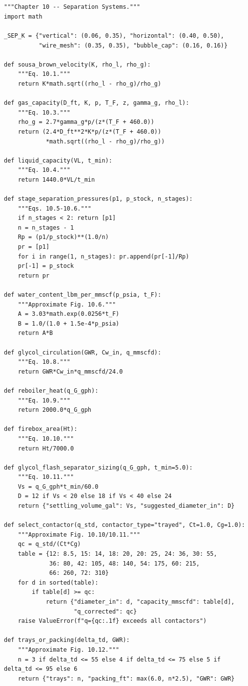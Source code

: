 \documentclass[10pt,a4paper,openany]{book}
\begin{document}
\chapter{}
\begin{lstlisting}
"""Chapter 10 -- Separation Systems."""
import math

_SEP_K = {"vertical": (0.06, 0.35), "horizontal": (0.40, 0.50),
          "wire_mesh": (0.35, 0.35), "bubble_cap": (0.16, 0.16)}

def sousa_brown_velocity(K, rho_l, rho_g):
    """Eq. 10.1."""
    return K*math.sqrt((rho_l - rho_g)/rho_g)

def gas_capacity(D_ft, K, p, T_F, z, gamma_g, rho_l):
    """Eq. 10.3."""
    rho_g = 2.7*gamma_g*p/(z*(T_F + 460.0))
    return (2.4*D_ft**2*K*p/(z*(T_F + 460.0))
            *math.sqrt((rho_l - rho_g)/rho_g))

def liquid_capacity(VL, t_min):
    """Eq. 10.4."""
    return 1440.0*VL/t_min

def stage_separation_pressures(p1, p_stock, n_stages):
    """Eqs. 10.5-10.6."""
    if n_stages < 2: return [p1]
    n = n_stages - 1
    Rp = (p1/p_stock)**(1.0/n)
    pr = [p1]
    for i in range(1, n_stages): pr.append(pr[-1]/Rp)
    pr[-1] = p_stock
    return pr

def water_content_lbm_per_mmscf(p_psia, t_F):
    """Approximate Fig. 10.6."""
    A = 3.03*math.exp(0.0256*t_F)
    B = 1.0/(1.0 + 1.5e-4*p_psia)
    return A*B

def glycol_circulation(GWR, Cw_in, q_mmscfd):
    """Eq. 10.8."""
    return GWR*Cw_in*q_mmscfd/24.0

def reboiler_heat(q_G_gph):
    """Eq. 10.9."""
    return 2000.0*q_G_gph

def firebox_area(Ht):
    """Eq. 10.10."""
    return Ht/7000.0

def glycol_flash_separator_sizing(q_G_gph, t_min=5.0):
    """Eq. 10.11."""
    Vs = q_G_gph*t_min/60.0
    D = 12 if Vs < 20 else 18 if Vs < 40 else 24
    return {"settling_volume_gal": Vs, "suggested_diameter_in": D}

def select_contactor(q_std, contactor_type="trayed", Ct=1.0, Cg=1.0):
    """Approximate Fig. 10.10/10.11."""
    qc = q_std/(Ct*Cg)
    table = {12: 8.5, 15: 14, 18: 20, 20: 25, 24: 36, 30: 55,
             36: 80, 42: 105, 48: 140, 54: 175, 60: 215,
             66: 260, 72: 310}
    for d in sorted(table):
        if table[d] >= qc:
            return {"diameter_in": d, "capacity_mmscfd": table[d],
                    "q_corrected": qc}
    raise ValueError(f"q={qc:.1f} exceeds all contactors")

def trays_or_packing(delta_td, GWR):
    """Approximate Fig. 10.12."""
    n = 3 if delta_td <= 55 else 4 if delta_td <= 75 else 5 if delta_td <= 95 else 6
    return {"trays": n, "packing_ft": max(6.0, n*2.5), "GWR": GWR}
\end{lstlisting}
\end{document}
